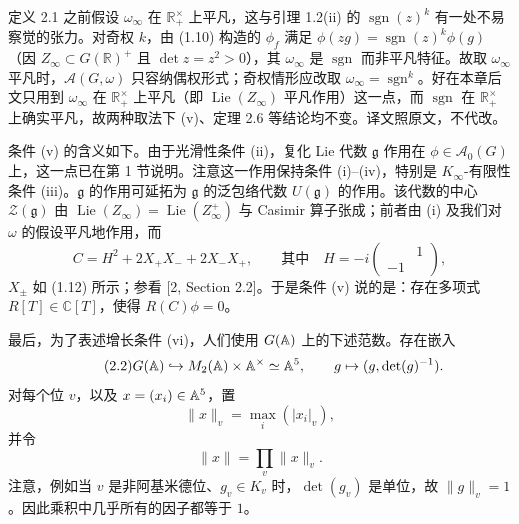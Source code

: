 \medskip
\begin{annote}
定义 2.1 之前假设 $\omega_\infty$ 在 $\mathbb{R}^\times_+$ 上平凡，这与引理 1.2(ii) 的 $\operatorname{sgn}(z)^k$ 有一处不易察觉的张力。对奇权 $k$，由 (1.10) 构造的 $\phi_f$ 满足 $\phi(zg)=\operatorname{sgn}(z)^k\phi(g)$（因 $Z_\infty\subset G(\mathbb{R})^+$ 且 $\det z=z^2>0$），其 $\omega_\infty$ 是 $\operatorname{sgn}$ 而非平凡特征。故取 $\omega_\infty$ 平凡时，$\mathcal{A}(G,\omega)$ 只容纳偶权形式；奇权情形应改取 $\omega_\infty=\operatorname{sgn}^k$。好在本章后文只用到 $\omega_\infty$ 在 $\mathbb{R}^\times_+$ 上平凡（即 $\operatorname{Lie}(Z_\infty)$ 平凡作用）这一点，而 $\operatorname{sgn}$ 在 $\mathbb{R}^\times_+$ 上确实平凡，故两种取法下 (v)、定理 2.6 等结论均不变。译文照原文，不代改。

\par\vspace{0.15em}{\raggedleft 【来源：对照引理 1.2(ii) 与定义 2.1(i)，原书第 136、138--139 页（A）】\par}
\end{annote}

条件 (v) 的含义如下。由于光滑性条件 (ii)，复化 Lie 代数 $\mathfrak{g}$ 作用在 $\phi\in\mathcal{A}_0(G)$ 上，这一点已在第 1 节说明。注意这一作用保持条件 (i)–(iv)，特别是 $K_\infty$-有限性条件 (iii)。$\mathfrak{g}$ 的作用可延拓为 $\mathfrak{g}$ 的泛包络代数 $U(\mathfrak{g})$ 的作用。该代数的中心 $\mathcal{Z}(\mathfrak{g})$ 由 $\operatorname{Lie}(Z_\infty)=\operatorname{Lie}(Z_\infty^+)$ 与 Casimir 算子张成；前者由 (i) 及我们对 $\omega$ 的假设平凡地作用，而
\begin{equation*}\tag{2.1}
C=H^2+2X_+X_-+2X_-X_+,\qquad\text{其中}\quad
H=-i\begin{pmatrix}&1\\-1&\end{pmatrix},
\end{equation*}
$X_\pm$ 如 (1.12) 所示；参看 [2, Section 2.2]。于是条件 (v) 说的是：存在多项式 $R[T]\in\mathbb{C}[T]$，使得 $R(C)\phi=0$。

最后，为了表述增长条件 (vi)，人们使用 $G(\mathbb{A})$ 上的下述范数。存在嵌入
\begin{equation*}\tag{2.2}
G(\mathbb{A})\hookrightarrow M_2(\mathbb{A})\times\mathbb{A}^\times\simeq\mathbb{A}^5,\qquad g\mapsto(g,\det(g)^{-1}).
\end{equation*}
对每个位 $v$，以及 $x=(x_i)\in\mathbb{A}^5$，置
\begin{equation*}\tag{2.3}
\|x\|_v=\max_i(|x_i|_v),
\end{equation*}
并令
\begin{equation*}\tag{2.4}
\|x\|=\prod_v\|x\|_v.
\end{equation*}
注意，例如当 $v$ 是非阿基米德位、$g_v\in K_v$ 时，$\det(g_v)$ 是单位，故 $\|g\|_v=1$。因此乘积中几乎所有的因子都等于 $1$。

